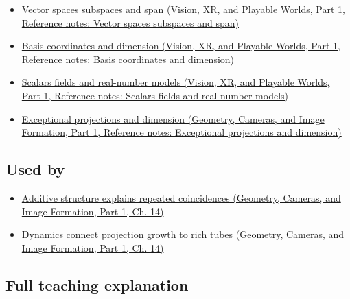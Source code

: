 \hypertarget{appendix-b0732b22e7d6-prerequisites}{}

\begin{itemize}
\tightlist
\item
  \href{../07-Vision-XR-and-Playable-Worlds-P01/main.pdf\#appendix-173b52c063ae}{Vector spaces subspaces and span (Vision, XR, and Playable Worlds, Part 1, Reference notes: Vector spaces subspaces and span)}
\item
  \href{../07-Vision-XR-and-Playable-Worlds-P01/main.pdf\#appendix-ce0341f7ea0d}{Basis coordinates and dimension (Vision, XR, and Playable Worlds, Part 1, Reference notes: Basis coordinates and dimension)}
\item
  \href{../07-Vision-XR-and-Playable-Worlds-P01/main.pdf\#appendix-52051ad550fe}{Scalars fields and real-number models (Vision, XR, and Playable Worlds, Part 1, Reference notes: Scalars fields and real-number models)}
\item
  \href{../03-Geometry-Cameras-and-Image-Formation-P01/main.pdf\#appendix-3c73f7862157}{Exceptional projections and dimension (Geometry, Cameras, and Image Formation, Part 1, Reference notes: Exceptional projections and dimension)}
\end{itemize}

\subsection{Used by}\label{appendix-b0732b22e7d6-used-by}

\hypertarget{appendix-b0732b22e7d6-used-by}{}

\begin{itemize}
\tightlist
\item
  \href{../03-Geometry-Cameras-and-Image-Formation-P01/main.pdf\#04-visual-computing-ii-ch033-additive-structure-explains-repeated-coincidences}{Additive structure explains repeated coincidences (Geometry, Cameras, and Image Formation, Part 1, Ch. 14)}
\item
  \href{../03-Geometry-Cameras-and-Image-Formation-P01/main.pdf\#04-visual-computing-ii-ch033-dynamics-connect-projection-growth-to-rich-tubes}{Dynamics connect projection growth to rich tubes (Geometry, Cameras, and Image Formation, Part 1, Ch. 14)}
\end{itemize}

\subsection{Full teaching explanation}\label{appendix-b0732b22e7d6-full-teaching-explanation}


